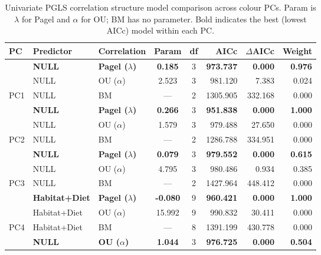 \begin{table}[!h]
\centering
\caption{\label{tab:tab:color_corr_model_comparison_combined}Univariate PGLS correlation structure model comparison across colour PCs. Param is $\lambda$ for Pagel and $\alpha$ for OU; BM has no parameter. Bold indicates the best (lowest AICc) model within each PC.}
\centering
\begin{tabular}[t]{lllccrrr}
\toprule
PC & Predictor & Correlation & Param & df & AICc & $\Delta$AICc & Weight\\
\midrule
 & \textbf{NULL} & \textbf{Pagel ($\lambda$)} & \textbf{0.185} & 3 & \textbf{973.737} & \textbf{0.000} & \textbf{0.976}\\

 & NULL & OU ($\alpha$) & 2.523 & 3 & 981.120 & 7.383 & 0.024\\

\multirow{-3}{*}{\raggedright\arraybackslash PC1} & NULL & BM & --- & 2 & 1305.905 & 332.168 & 0.000\\
\cmidrule{1-8}
 & \textbf{NULL} & \textbf{Pagel ($\lambda$)} & \textbf{0.266} & 3 & \textbf{951.838} & \textbf{0.000} & \textbf{1.000}\\

 & NULL & OU ($\alpha$) & 1.579 & 3 & 979.488 & 27.650 & 0.000\\

\multirow{-3}{*}{\raggedright\arraybackslash PC2} & NULL & BM & --- & 2 & 1286.788 & 334.951 & 0.000\\
\cmidrule{1-8}
 & \textbf{NULL} & \textbf{Pagel ($\lambda$)} & \textbf{0.079} & 3 & \textbf{979.552} & \textbf{0.000} & \textbf{0.615}\\

 & NULL & OU ($\alpha$) & 4.795 & 3 & 980.486 & 0.934 & 0.385\\

\multirow{-3}{*}{\raggedright\arraybackslash PC3} & NULL & BM & --- & 2 & 1427.964 & 448.412 & 0.000\\
\cmidrule{1-8}
 & \textbf{Habitat+Diet} & \textbf{Pagel ($\lambda$)} & \textbf{-0.080} & 9 & \textbf{960.421} & \textbf{0.000} & \textbf{1.000}\\

 & Habitat+Diet & OU ($\alpha$) & 15.992 & 9 & 990.832 & 30.411 & 0.000\\

\multirow{-3}{*}{\raggedright\arraybackslash PC4} & Habitat+Diet & BM & --- & 8 & 1391.199 & 430.778 & 0.000\\
\cmidrule{1-8}
 & \textbf{NULL} & \textbf{OU ($\alpha$)} & \textbf{1.044} & 3 & \textbf{976.725} & \textbf{0.000} & \textbf{0.504}\\


\end{tabular}
\end{table}
